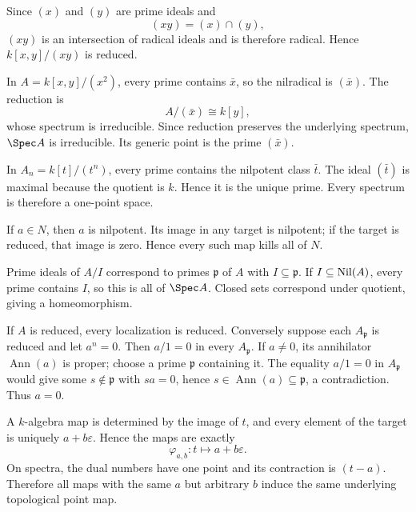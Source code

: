 \begin{solution}
Since $(x)$ and $(y)$ are prime ideals and
\[
(xy)=(x)\cap(y),
\]
$(xy)$ is an intersection of radical ideals and is therefore radical.  Hence
$k[x,y]/(xy)$ is reduced.
\end{solution}

\begin{solution}
In $A=k[x,y]/(x^2)$, every prime contains $\bar x$, so the nilradical is $(\bar x)$.
The reduction is
\[
A/(\bar x)\cong k[y],
\]
whose spectrum is irreducible.  Since reduction preserves the underlying spectrum,
$\Spec A$ is irreducible.  Its generic point is the prime $(\bar x)$.
\end{solution}

\begin{solution}
In $A_n=k[t]/(t^n)$, every prime contains the nilpotent class $\bar t$.  The ideal
$(\bar t)$ is maximal because the quotient is $k$.  Hence it is the unique prime.  Every
spectrum is therefore a one-point space.
\end{solution}

\begin{solution}
If $a\in N$, then $a$ is nilpotent.  Its image in any target is nilpotent; if the target is
reduced, that image is zero.  Hence every such map kills all of $N$.
\end{solution}

\begin{solution}
Prime ideals of $A/I$ correspond to primes $\mathfrak p$ of $A$ with $I\subseteq\mathfrak p$.
If $I\subseteq\operatorname{Nil}(A)$, every prime contains $I$, so this is all of $\Spec A$.  Closed sets
correspond under quotient, giving a homeomorphism.
\end{solution}

\begin{solution}
If $A$ is reduced, every localization is reduced.  Conversely suppose each
$A_{\mathfrak p}$ is reduced and let $a^n=0$.  Then $a/1=0$ in every $A_{\mathfrak p}$.
If $a\neq0$, its annihilator $\operatorname{Ann}(a)$ is proper; choose a prime
$\mathfrak p$ containing it.  The equality $a/1=0$ in $A_{\mathfrak p}$ would give some
$s\notin\mathfrak p$ with $sa=0$, hence $s\in\operatorname{Ann}(a)\subseteq\mathfrak p$,
a contradiction.  Thus $a=0$.
\end{solution}

\begin{solution}
A $k$-algebra map is determined by the image of $t$, and every element of the target is
uniquely $a+b\varepsilon$.  Hence the maps are exactly
\[
\varphi_{a,b}:t\mapsto a+b\varepsilon.
\]
On spectra, the dual numbers have one point and its contraction is $(t-a)$.  Therefore all
maps with the same $a$ but arbitrary $b$ induce the same underlying topological point map.
\end{solution}
